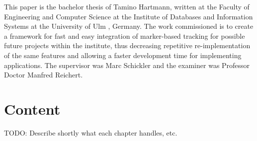 This paper is the bachelor thesis of Tamino Hartmann, written at the Faculty of Engineering and Computer Science \cite{faculty} at the Institute of Databases and Information Systems at the University of Ulm \cite{ulmuni}, Germany.
The work commissioned is to create a framework for fast and easy integration of marker-based tracking for possible future projects within the institute, thus decreasing repetitive re-implementation of the same features and allowing a faster development time for implementing applications.
The supervisor was Marc Schickler and the examiner was Professor Doctor Manfred Reichert.

\section{Content}

TODO: Describe shortly what each chapter handles, etc.
